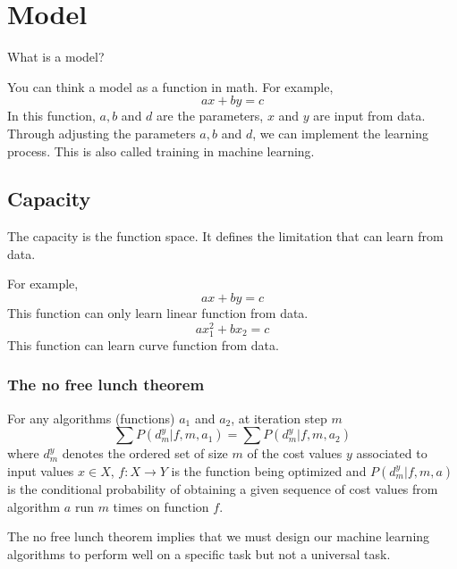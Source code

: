 
\chapter{Model}
\label{cha:model}

What is a model?

You can think a model as a function in math.
For example,
\begin{equation*}
  ax + by = c
\end{equation*}
In this function, \(a, b\) and \(d\) are the parameters, \(x\) and \(y\) are input from data.
Through adjusting the parameters \(a, b\) and \(d\), we can implement the learning process.
This is also called training in machine learning.

\section{Capacity}
\label{sec:capacity}

The capacity is the function space.
It defines the limitation that can learn from data.

For example,
\begin{equation*}
  ax + by = c  
\end{equation*}
This function can only learn linear function from data.
\begin{equation*}
  ax_{1}^{2} + bx_{2} = c
\end{equation*}
This function can learn curve function from data.


\subsection{The no free lunch theorem}


For any algorithms (functions) \(a_{1}\) and \(a_{2}\), at iteration step \(m\)
\begin{equation}
  \label{eq:1}
  \sum P(d_{m}^{y}|f,m,a_{1}) = \sum P(d_{m}^{y}|f,m,a_{2})
\end{equation}
where \(d_{m}^{y}\) denotes the ordered set of size \(m\) of the cost values \(y\) associated to input values \(x \in X\), \(f:X\longrightarrow Y\) is the function being optimized and \(P(d_{m}^{y}|f,m,a)\) is the conditional probability of obtaining a given sequence of cost values from algorithm \(a\) run \(m\) times on function \(f\).

The no free lunch theorem implies that we must design our machine learning algorithms to perform well on a specific task but not a universal task.

